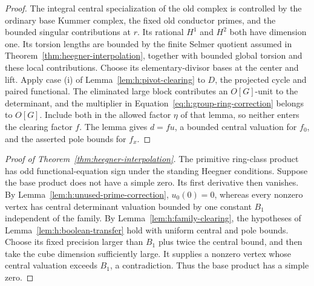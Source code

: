 \begin{proof}
The integral central specialization of the old complex is controlled
by the ordinary base Kummer complex, the fixed old conductor primes,
and the bounded singular contributions at $r$. Its rational $H^1$ and
$H^2$ both have dimension one. Its torsion lengths are bounded by the
finite Selmer quotient assumed in
Theorem~\ref{thm:heegner-interpolation}, together with bounded global
torsion and these local contributions. Choose its elementary-divisor
bases at the center and lift. Apply case \textup{(i)} of
Lemma~\ref{lem:h:pivot-clearing} to $D$, the projected cycle and
paired functional. The eliminated large block contributes an
$O[G]$-unit to the determinant, and the multiplier in
Equation~\eqref{eq:h:group-ring-correction} belongs to $O[G]$.
Include both in the allowed factor $\eta$ of that lemma, so neither
enters the clearing factor $f$. The lemma gives $d=fu$, a bounded
central valuation for $f_0$, and the asserted pole bounds for $f_x$.
\end{proof}

\begin{proof}[Proof of Theorem~\ref{thm:heegner-interpolation}]
The primitive ring-class product has odd functional-equation sign
under the standing Heegner conditions. Suppose the base product does
not have a simple zero. Its first derivative then vanishes. By
Lemma~\ref{lem:h:unused-prime-correction}, $u_0(0)=0$, whereas every
nonzero vertex has central determinant valuation bounded by one
constant $B_1$ independent of the family. By
Lemma~\ref{lem:h:family-clearing}, the hypotheses of
Lemma~\ref{lem:h:boolean-transfer} hold with uniform central and pole
bounds. Choose its fixed precision larger than $B_1$ plus twice the
central bound, and then take the cube dimension sufficiently large.
It supplies a nonzero vertex whose central valuation exceeds $B_1$,
a contradiction. Thus the base product has a simple zero.
\end{proof}
